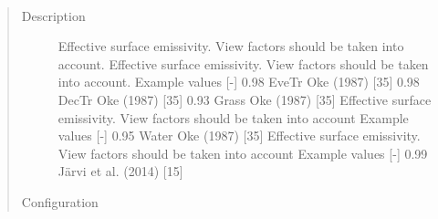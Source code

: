 \documentclass[letterpaper,10pt,english]{sphinxmanual}
\begin{document}

\begin{fulllineitems}
\label{\detokenize{input_files/SUEWS_SiteInfo/Input_Options:cmdoption-arg-emissivity}}~\begin{quote}\begin{description}
\item[{Description}] \leavevmode
Effective surface emissivity. View factors should be taken into account. Effective surface emissivity. View factors should be taken into account. Example values {[}-{]} 0.98 EveTr Oke (1987) {[}35{]}  0.98 DecTr Oke (1987) {[}35{]}  0.93 Grass Oke (1987) {[}35{]}  Effective surface emissivity. View factors should be taken into account Example values {[}-{]} 0.95 Water Oke (1987) {[}35{]}  Effective surface emissivity. View factors should be taken into account Example values {[}-{]} 0.99 Järvi et al. (2014) {[}15{]}

\item[{Configuration}] \leavevmode


\end{description}
\end{quote}
\end{fulllineitems}
\end{document}

